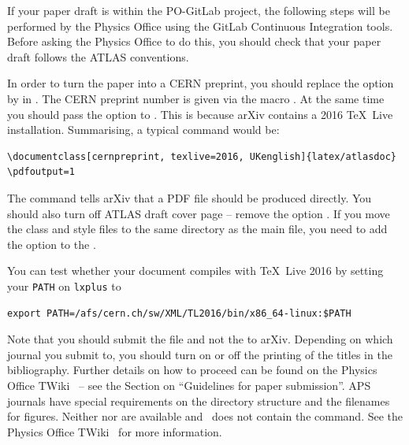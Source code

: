 If your paper draft is within the PO-GitLab project, the following steps will be
performed by the Physics Office using the GitLab Continuous Integration tools.
Before asking the Physics Office to do this,
you should check that your paper draft follows the ATLAS conventions.

In order to turn the paper into a CERN preprint,
you should replace the option  by  in .
The CERN preprint number is given via the macro .
At the same time you should pass the option  to
.
This is because arXiv contains a 2016 \TeX\ Live installation.
Summarising, a typical  command would be:
\begin{verbatim}
\documentclass[cernpreprint, texlive=2016, UKenglish]{latex/atlasdoc}
\pdfoutput=1
\end{verbatim}
The  command tells arXiv that a PDF file should be produced directly.
You should also turn off ATLAS draft cover page -- remove the option .
If you move the class and style files to the same directory as the main file,
you need to add the option  to the .

You can test whether your document compiles with \TeX\ Live 2016 by setting your \texttt{PATH} on \texttt{lxplus} to
\begin{verbatim}
export PATH=/afs/cern.ch/sw/XML/TL2016/bin/x86_64-linux:$PATH
\end{verbatim}

Note that you should submit the  file and not the  to arXiv.
Depending on which journal you submit to, you should turn on or off the printing of the titles in the bibliography.
Further details on how to proceed can be found on the Physics Office TWiki~\cite{atlas-physicsoffice} -- see
the Section on \enquote{Guidelines for paper submission}.
APS journals have special requirements on the directory structure and the filenames for figures.
Neither  nor  are available
and \KOMAScript\ does not contain the  command.
See the Physics Office TWiki~\cite{atlas-physicsoffice} for more information.

